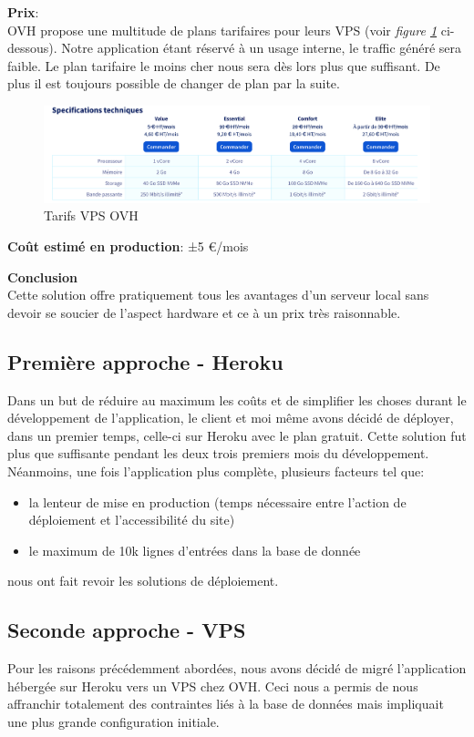 \newpara
\textbf{Prix}: \\ OVH propose une multitude de plans tarifaires pour leurs VPS (voir \textit{figure \ref{ovh-pricing}} ci-dessous). Notre application étant réservé à un usage interne, le traffic généré sera faible. Le plan tarifaire le moins cher nous sera dès lors plus que suffisant. De plus il est toujours possible de changer de plan par la suite. 
\begin{figure}[H]
  \centering
  \includegraphics[width=\linewidth]{img/vps-tarifs.png}
  \caption{Tarifs VPS OVH}
  \label{ovh-pricing}
\end{figure}



\newpara
\textbf{Coût estimé en production}: ±5 €/mois

\newpara
\textbf{Conclusion} \\ Cette solution offre pratiquement tous les avantages d'un serveur local sans devoir se soucier de l'aspect hardware et ce à un prix très raisonnable. 

\newpage
\subsection{Première approche - Heroku}
Dans un but de réduire au maximum les coûts et de simplifier les choses durant le développement de l'application, le client et moi même avons décidé de déployer, dans un premier temps, celle-ci sur Heroku avec le plan gratuit. Cette solution fut plus que suffisante pendant les deux trois premiers mois du développement. Néanmoins, une fois l'application plus complète, plusieurs facteurs tel que: 
\begin{itemize}
  \item la lenteur de mise en production (temps nécessaire entre l'action de déploiement et l'accessibilité du site)
  \item le maximum de 10k lignes d'entrées dans la base de donnée 
\end{itemize}
nous ont fait revoir les solutions de déploiement. 

\subsection{Seconde approche - VPS}
Pour les raisons précédemment abordées, nous avons décidé de migré l'application hébergée sur Heroku vers un VPS chez OVH. Ceci nous a permis de nous affranchir totalement des contraintes liés à la base de données mais impliquait une plus grande configuration initiale. 

